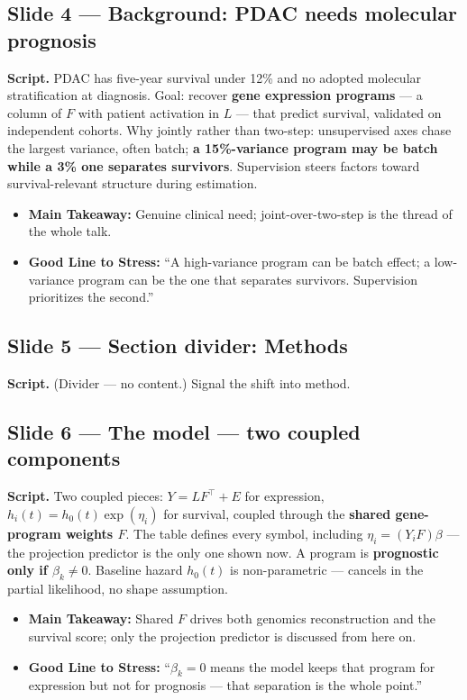 \documentclass[11pt]{article}
\newcommand{\scriptlabel}{\textbf{Script. }}
\newcommand{\sectionlabel}[1]{\textbf{#1}}
\newcommand{\key}[1]{\textcolor{keyblue}{\textbf{#1}}}        %
\begin{document}
\subsection*{Slide 4 --- Background: PDAC needs molecular prognosis}
\scriptlabel PDAC has five-year survival under 12\% and no adopted molecular stratification at
diagnosis. Goal: recover \key{gene expression programs} --- a column of $F$ with patient activation in
$L$ --- that predict survival, validated on independent cohorts. Why jointly rather than two-step:
unsupervised axes chase the largest variance, often batch; \key{a 15\%-variance program may be batch
while a 3\% one separates survivors}. Supervision steers factors toward survival-relevant structure
during estimation.

\begin{itemize}
\item \sectionlabel{Main Takeaway:} Genuine clinical need; joint-over-two-step is the thread of the
whole talk.
\item \sectionlabel{Good Line to Stress:} ``A high-variance program can be batch effect; a
low-variance program can be the one that separates survivors. Supervision prioritizes the second.''
\end{itemize}

\subsection*{Slide 5 --- Section divider: Methods}
\scriptlabel (Divider --- no content.) Signal the shift into method.

\subsection*{Slide 6 --- The model --- two coupled components}
\scriptlabel Two coupled pieces: $Y = LF^\top + E$ for expression, $h_i(t) = h_0(t)\exp(\eta_i)$ for
survival, coupled through the \key{shared gene-program weights $F$}. The table defines every symbol,
including $\eta_i = (Y_iF)\beta$ --- the projection predictor is the only one shown now. A program is
\key{prognostic only if $\beta_k \neq 0$}. Baseline hazard $h_0(t)$ is non-parametric --- cancels in
the partial likelihood, no shape assumption.

\begin{itemize}
\item \sectionlabel{Main Takeaway:} Shared $F$ drives both genomics reconstruction and the survival
score; only the projection predictor is discussed from here on.
\item \sectionlabel{Good Line to Stress:} ``$\beta_k = 0$ means the model keeps that program for
expression but not for prognosis --- that separation is the whole point.''
\end{itemize}
\end{document}
